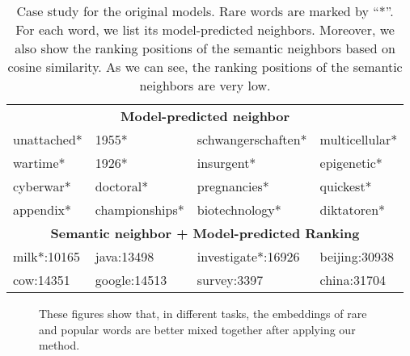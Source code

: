 \documentclass{article}
\begin{document}
\begin{table}[!ht]
\begin{center}
\begin{tabular}{|p{2.5cm}|p{2.5cm}||p{2.5cm}|p{2.5cm}|}
  			\cline{1-4}
           \multicolumn{4}{|c|}{\bf Model-predicted neighbor} \\
           \cline{1-4}
            unattached*  & 1955* & \small schwangerschaften* & multicellular*\\
            wartime* & 1926* & insurgent* & epigenetic*\\
            cyberwar* & doctoral* & pregnancies* & quickest* \\
            appendix* & championships* &biotechnology* & diktatoren*\\
           \cline{1-4}
		   \multicolumn{4}{|c|}{\bf Semantic neighbor + Model-predicted Ranking}\\
           \cline{1-4}
			milk*:10165 & java:13498 & investigate*:16926 & beijing:30938\\
            cow:14351 & google:14513 & survey:3397 & china:31704\\
            \bottomrule
		\end{tabular}
	\end{center}
	\caption{\label{Compare2-table} Case study for the original models. Rare words are marked by ``*''. For each word, we list its model-predicted neighbors. Moreover, we also show the ranking positions of the semantic neighbors based on cosine similarity. As we can see, the ranking positions of the semantic neighbors are very low.}
\end{table}

\begin{figure}[!thbp]
\centering
{}
\caption{These figures show that, in different tasks,  the embeddings of rare and popular words are better mixed together after applying our method.}
\label{fig:adv}
\end{figure}
\end{document}
